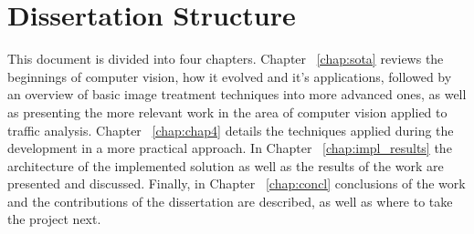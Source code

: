 \section{Dissertation Structure} \label{sec:struct}

This document is divided into four chapters. Chapter ~\ref{chap:sota} reviews the beginnings of computer vision, how it evolved and it's applications, followed by an overview of basic image treatment techniques into more advanced ones, as well as presenting the more relevant work in the area of computer vision applied to traffic analysis. Chapter ~\ref{chap:chap4} details the techniques applied during the development in a more practical approach. In Chapter ~\ref{chap:impl_results} the architecture of the implemented solution as well as the results of the work are presented and discussed. Finally, in Chapter ~\ref{chap:concl} conclusions of the work and the contributions of the dissertation are described, as well as where to take the project next.